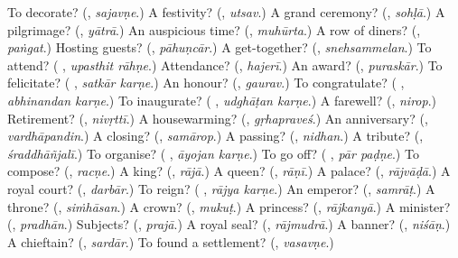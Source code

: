 \begin{tcolorbox}[breakable,colback=teal!4,colframe=teal!35!black,title={Before you move on}]
To decorate? (\textbf{}, \emph{sajavṇe}.) A festivity? (\textbf{}, \emph{utsav}.) A grand ceremony? (\textbf{}, \emph{sohḷā}.) A pilgrimage? (\textbf{}, \emph{yātrā}.) An auspicious time? (\textbf{}, \emph{muhūrta}.) A row of diners? (\textbf{}, \emph{paṅgat}.) Hosting guests? (\textbf{}, \emph{pāhuṇcār}.) A get-together? (\textbf{}, \emph{snehsammelan}.) To attend? (\textbf{ }, \emph{upasthit rāhṇe}.) Attendance? (\textbf{}, \emph{hajerī}.) An award? (\textbf{}, \emph{puraskār}.) To felicitate? (\textbf{ }, \emph{satkār karṇe}.) An honour? (\textbf{}, \emph{gaurav}.) To congratulate? (\textbf{ }, \emph{abhinandan karṇe}.) To inaugurate? (\textbf{ }, \emph{udghāṭan karṇe}.) A farewell? (\textbf{}, \emph{nirop}.) Retirement? (\textbf{}, \emph{nivṛttī}.) A housewarming? (\textbf{}, \emph{gṛhapraveś}.) An anniversary? (\textbf{}, \emph{vardhāpandin}.) A closing? (\textbf{}, \emph{samārop}.) A passing? (\textbf{}, \emph{nidhan}.) A tribute? (\textbf{}, \emph{śraddhāñjalī}.) To organise? (\textbf{ }, \emph{āyojan karṇe}.) To go off? (\textbf{ }, \emph{pār paḍṇe}.) To compose? (\textbf{}, \emph{racṇe}.) A king? (\textbf{}, \emph{rājā}.) A queen? (\textbf{}, \emph{rāṇī}.) A palace? (\textbf{}, \emph{rājvāḍā}.) A royal court? (\textbf{}, \emph{darbār}.) To reign? (\textbf{ }, \emph{rājya karṇe}.) An emperor? (\textbf{}, \emph{samrāṭ}.) A throne? (\textbf{}, \emph{siṁhāsan}.) A crown? (\textbf{}, \emph{mukuṭ}.) A princess? (\textbf{}, \emph{rājkanyā}.) A minister? (\textbf{}, \emph{pradhān}.) Subjects? (\textbf{}, \emph{prajā}.) A royal seal? (\textbf{}, \emph{rājmudrā}.) A banner? (\textbf{}, \emph{niśāṇ}.) A chieftain? (\textbf{}, \emph{sardār}.) To found a settlement? (\textbf{}, \emph{vasavṇe}.)
\end{tcolorbox}
